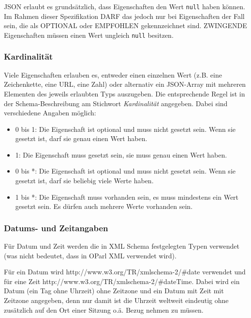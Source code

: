 \documentclass[,a4paper]{article}
\begin{document}
JSON erlaubt es grundsätzlich, dass Eigenschaften den Wert \texttt{null}
haben können. Im Rahmen dieser Spezifikation DARF das jedoch nur bei
Eigenschaften der Fall sein, die als OPTIONAL oder EMPFOHLEN
gekennzeichnet sind. ZWINGENDE Eigenschaften müssen einen Wert ungleich
\texttt{null} besitzen.

\subsubsection{Kardinalität}\label{kardinalituxe4t}

Viele Eigenschaften erlauben es, entweder einen einzelnen Wert (z.B.
eine Zeichenkette, eine URL, eine Zahl) oder alternativ ein JSON-Array
mit mehreren Elementen des jeweils erlaubten Typs auszugeben. Die
entsprechende Regel ist in der Schema-Beschreibung am Stichwort
\emph{Kardinalität} angegeben. Dabei sind verschiedene Angaben möglich:

\begin{itemize}
\item
  0 bis 1: Die Eigenschaft ist optional und muss nicht gesetzt sein.
  Wenn sie gesetzt ist, darf sie genau einen Wert haben.
\item
  1: Die Eigenschaft muss gesetzt sein, sie muss genau einen Wert haben.
\item
  0 bis *: Die Eigenschaft ist optional und muss nicht gesetzt sein.
  Wenn sie gesetzt ist, darf sie beliebig viele Werte haben.
\item
  1 bis *: Die Eigenschaft muss vorhanden sein, es muss mindestens ein
  Wert gesetzt sein. Es dürfen auch mehrere Werte vorhanden sein.
\end{itemize}

\subsubsection{Datums- und Zeitangaben}\label{datums--und-zeitangaben}

Für Datum und Zeit werden die in XML Schema festgelegten Typen verwendet
(was nicht bedeutet, dass in OParl XML verwendet wird).

Für ein Datum wird http://www.w3.org/TR/xmlschema-2/\#date verwendet und
für eine Zeit http://www.w3.org/TR/xmlschema-2/\#dateTime. Dabei wird
ein Datum (ein Tag ohne Uhrzeit) ohne Zeitzone und ein Datum mit Zeit
mit Zeitzone angegeben, denn nur damit ist die Uhrzeit weltweit
eindeutig ohne zusätzlich auf den Ort einer Sitzung o.ä. Bezug nehmen zu
müssen.
\end{document}
